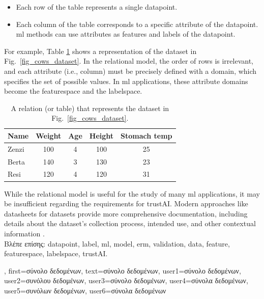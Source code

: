 {{		\begin{itemize} 
		\item Each row of the table represents a single \gls{datapoint}.
		\item Each column of the table corresponds to a specific attribute of the \gls{datapoint}. 
		\gls{ml} methods can use attributes as \gls{feature}s and \gls{label}s of the \gls{datapoint}.
		\end{itemize}
		For example, Table \ref{tab:cowdata} shows a representation of the dataset in Fig.\ \ref{fig_cows_dataset}. 
		In the relational \gls{model}, the order of rows is irrelevant, and each attribute (i.e., column) must be 
		precisely defined with a domain, which specifies the set of possible values. In \gls{ml} applications, 
		these attribute domains become the \gls{featurespace} and the \gls{labelspace}.
		\begin{table}[H]
			\centering
			\begin{tabular}{lcccc}
				\hline
				\textbf{Name} & \textbf{Weight} & \textbf{Age} & \textbf{Height} & \textbf{Stomach temp} \\
				\hline
				Zenzi & 100 & 4 & 100 & 25 \\
				Berta & 140 & 3 & 130 & 23 \\
				Resi  & 120 & 4 & 120 & 31 \\
				\hline
			\end{tabular}
			\caption{A relation (or table) that represents the dataset in Fig.\ \ref{fig_cows_dataset}.}
			\label{tab:cowdata}
		\end{table}
 	While the relational \gls{model} is useful for the study of many \gls{ml} applications, it may be 
 	insufficient regarding the requirements for \gls{trustAI}. Modern 
 	approaches like datasheets for datasets provide more comprehensive 
 	documentation, including details about the dataset’s collection process, intended 
 	use, and other contextual information \cite{DatasheetData2021}.\\
 \foreignlanguage{greek}{Βλέπε επίσης:} \gls{datapoint}, \gls{label}, \gls{ml}, \gls{model}, \gls{erm}, \gls{validation}, \gls{data}, \gls{feature}, \gls{featurespace}, \gls{labelspace}, \gls{trustAI}.},
 first={\foreignlanguage{greek}{σύνολο δεδομένων}},
 text={\foreignlanguage{greek}{σύνολο δεδομένων}},
 user1={\foreignlanguage{greek}{σύνολο δεδομένων}}, %
 user2={\foreignlanguage{greek}{συνόλου δεδομένων}}, %
 user3={\foreignlanguage{greek}{σύνολο δεδομένων}}, %
 user4={\foreignlanguage{greek}{σύνολα δεδομένων}}, %
 user5={\foreignlanguage{greek}{συνόλων δεδομένων}}, %
 user6={\foreignlanguage{greek}{σύνολα δεδομένων}} %
}

